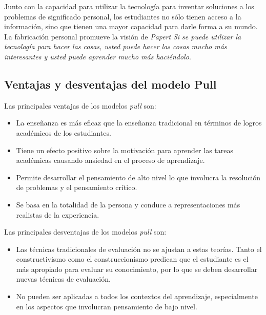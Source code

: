 \begin{itemize}
    Junto con la capacidad para utilizar la tecnología para inventar soluciones
    a los problemas de significado personal, los estudiantes no sólo tienen
    acceso a la información, sino que tienen una mayor capacidad para darle
    forma a su mundo. La fabricación personal promueve la visión de
    \textit{Papert} \emph{Si se puede utilizar la tecnología para hacer las
        cosas, usted puede hacer las cosas mucho más interesantes y usted puede
        aprender mucho más haciéndolo}\cite{papertian:const}.

\end{itemize}

\subsection{Ventajas y desventajas del modelo Pull}

Las principales ventajas de los modelos \emph{pull} son:

\begin{itemize}

\item La enseñanza es más eficaz que la enseñanza tradicional en términos de
    logros académicos de los estudiantes\cite{kim2005effects}.

\item Tiene un efecto positivo sobre la motivación
    para aprender las tareas académicas causando ansiedad en el proceso de
    aprendizaje\cite{kim2005effects}.


\item Permite desarrollar el pensamiento de alto nivel lo que involucra la 
	resolución de problemas y el
    pensamiento crítico\cite{wilson2012constructivism}.

\item Se basa en la totalidad de la persona y
    conduce a representaciones más realistas de la
    experiencia\cite{wilson2012constructivism}.

\end{itemize}

Las principales desventajas de los modelos \emph{pull} son:

\begin{itemize}

\item Las técnicas tradicionales de evaluación no se ajustan a estas
    teorías. Tanto el constructivismo como el construccionismo predican 
    que el estudiante es el más apropiado para evaluar su conocimiento, por
    lo que se deben desarrollar nuevas técnicas de
    evaluación\cite{lai1995implications}.

\item No pueden ser aplicadas a todos los contextos del
    aprendizaje\cite{lai1995implications}, especialmente en los aspectos
    que involucran pensamiento de bajo nivel.

\end{itemize}
